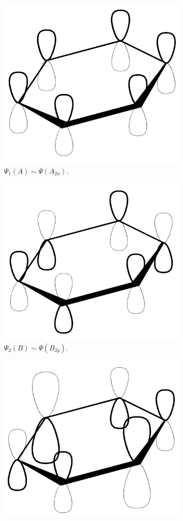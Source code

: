 \documentclass[../notes.tex]{subfiles}
\begin{document}
\begin{itemize}
\begin{itemize}
\begin{figure}[h!]
\begin{subfigure}[b]{0.25\linewidth}
                \includegraphics[width=0.7\linewidth]{../ExtFiles/benzeneMOsa.png}
                \caption{$\Psi_1(A)\sim\Psi(A_{2u})$.}
                \label{fig:benzeneMOsa}
            \end{subfigure}
            \begin{subfigure}[b]{0.25\linewidth}
                \centering
                \includegraphics[width=0.7\linewidth]{../ExtFiles/benzeneMOsb.png}
                \caption{$\Psi_2(B)\sim\Psi(B_{2g})$.}
                \label{fig:benzeneMOsb}
            \end{subfigure}
            \begin{subfigure}[b]{0.25\linewidth}
                \centering
                \includegraphics[width=0.7\linewidth]{../ExtFiles/benzeneMOsc.png}

\end{subfigure}
\end{figure}
\end{itemize}
\end{itemize}
\end{document}
